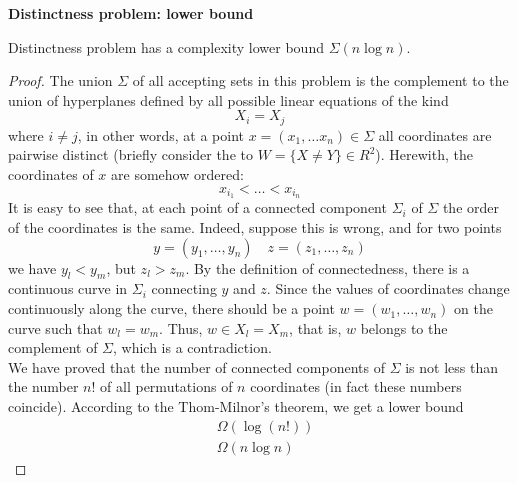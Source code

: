 \textbf{Distinctness problem: lower bound}\\
\begin{theorem}
    Distinctness problem has a complexity lower bound $\Sigma(n \log n)$.
\end{theorem}
\begin{proof}
    The union $\Sigma$ of all accepting sets in this problem
    is the complement to the union of hyperplanes defined by
    all possible linear equations of the kind
    $$X_i = X_j$$
    where $i \neq j$,
    in other words,
    at a point $x = (x_1, \dots x_n) \in \Sigma$ all coordinates are pairwise distinct
    (briefly consider the to $W = \{X \neq Y \} \in R^2$).
    Herewith, the coordinates of $x$ are somehow ordered:
    $$x_{i_1} < \dots < x_{i_n}$$
    It is easy to see that,
    at each point of a connected component $\Sigma_i$ of $\Sigma$
    the order of the coordinates is the same.
    Indeed, suppose this is wrong, and for two points
    $$y = (y_1, \dots , y_n)\quad z = (z_1, \dots , z_n)$$
    we have $y_l < y_m$,
    but $z_l > z_m$.
    By the definition of connectedness,
    there is a continuous curve in $\Sigma_i$ connecting $y$ and $z$.
    Since the values of coordinates change continuously along the curve,
    there should be a point $w = (w_1, \dots , w_n)$ on the curve such that $w_l = w_m$.
    Thus, $w \in {X_l = X_m}$,
    that is, $w$ belongs to the complement of $\Sigma$, which is a contradiction.\\

    We have proved that the number of connected components of $\Sigma$
    is not less than the number $n!$ of all permutations of $n$ coordinates (in fact these numbers coincide).
    According to the Thom-Milnor’s theorem, we get a lower bound
    \begin{align*}
        &\Omega(\log(n!)) \\
        &\Omega(n \log n)
    \end{align*}
\end{proof}
